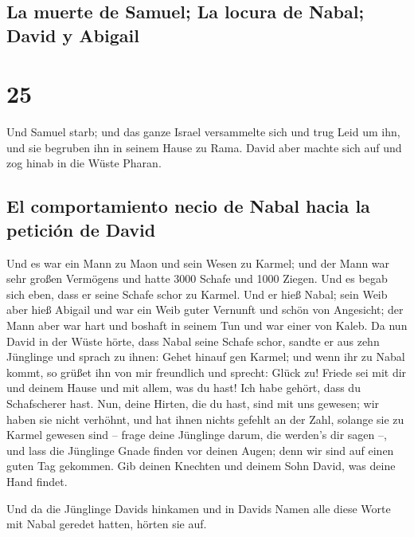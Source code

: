 \hypertarget{la-muerte-de-samuel-la-locura-de-nabal-david-y-abigail}{%
\subsection{La muerte de Samuel; La locura de Nabal; David y
Abigail}\label{la-muerte-de-samuel-la-locura-de-nabal-david-y-abigail}}

\hypertarget{section-24}{%
\section{25}\label{section-24}}

 Und Samuel starb; und das ganze Israel versammelte sich
und trug Leid um ihn, und sie begruben ihn in seinem Hause zu Rama.
David aber machte sich auf und zog hinab in die Wüste Pharan.

\hypertarget{el-comportamiento-necio-de-nabal-hacia-la-peticiuxf3n-de-david}{%
\subsection{El comportamiento necio de Nabal hacia la petición de
David}\label{el-comportamiento-necio-de-nabal-hacia-la-peticiuxf3n-de-david}}

 Und es war ein Mann zu Maon und sein Wesen zu Karmel; und
der Mann war sehr großen Vermögens und hatte 3000 Schafe und 1000
Ziegen. Und es begab sich eben, dass er seine Schafe schor zu Karmel.
 Und er hieß Nabal; sein Weib aber hieß Abigail und war
ein Weib guter Vernunft und schön von Angesicht; der Mann aber war hart
und boshaft in seinem Tun und war einer von Kaleb.  Da nun
David in der Wüste hörte, dass Nabal seine Schafe schor, 
sandte er aus zehn Jünglinge und sprach zu ihnen: Gehet hinauf gen
Karmel; und wenn ihr zu Nabal kommt, so grüßet ihn von mir freundlich
 und sprecht: Glück zu! Friede sei mit dir und deinem
Hause und mit allem, was du hast!  Ich habe gehört, dass
du Schafscherer hast. Nun, deine Hirten, die du hast, sind mit uns
gewesen; wir haben sie nicht verhöhnt, und hat ihnen nichts gefehlt an
der Zahl, solange sie zu Karmel gewesen sind --  frage
deine Jünglinge darum, die werden's dir sagen --, und lass die Jünglinge
Gnade finden vor deinen Augen; denn wir sind auf einen guten Tag
gekommen. Gib deinen Knechten und deinem Sohn David, was deine Hand
findet.

 Und da die Jünglinge Davids hinkamen und in Davids Namen
alle diese Worte mit Nabal geredet hatten, hörten sie auf.


